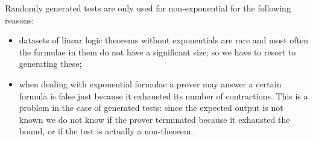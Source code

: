 Randomly generated tests are only used for non-exponential for the following reasons:
\begin{itemize}
	\item datasets of linear logic theorems without exponentials are rare and most often the formulae in them do not have a significant size; so we have to resort to generating these;
	\item when dealing with exponential formulae a prover may answer a certain formula is false just because it exhausted its number of contractions.
		This is a problem in the case of generated tests: since the expected output is not known we do not know if the prover terminated because it exhausted the bound, or if the test is actually a non-theorem.
\end{itemize}

